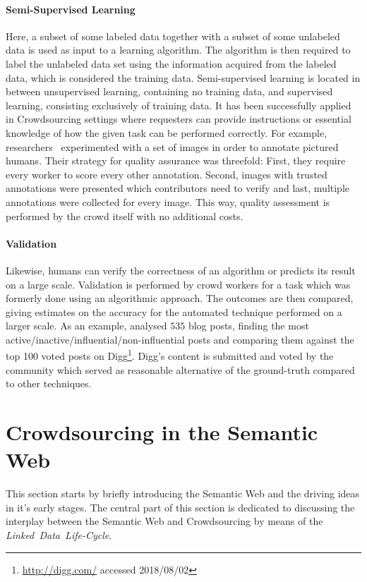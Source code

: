 \documentclass[draft,final]{vutinfth} %
\begin{document}
\paragraph{Semi-Supervised Learning} Here, a subset of some labeled data together with a subset of some unlabeled data is used as input to a learning
algorithm. The algorithm is then required to label the unlabeled data set using the information acquired from the labeled data, which is considered the training data. Semi-supervised learning is located in between unsupervised learning, containing no training data, and supervised learning, consisting exclusively of training data. It has been successfully applied in Crowdsourcing settings where requesters can provide instructions or essential knowledge of how the given task
can be performed correctly. For example, researchers~\cite{sorokin2008} experimented with a set of images in order to annotate pictured humans. Their strategy for quality assurance was threefold: First, they require every worker to score every other annotation. Second, images with trusted annotations were presented which contributors need to verify and last, multiple annotations were collected for every image. This way, quality assessment is performed by the crowd itself with no additional costs.  

\paragraph{Validation} Likewise, humans can verify the correctness of an algorithm or predicts its result on a large scale. Validation is performed by crowd workers for a task which was formerly done using an algorithmic approach. The outcomes are then compared, giving estimates on the accuracy for the automated technique performed on a larger scale. As an example, \cite{agarwal2008} analysed $535$ blog posts, finding the most active/inactive/influential/non-influential posts and comparing them against the top 100 voted posts on Digg\footnote{\url{http://digg.com/} accessed 2018/08/02}. Digg's content is submitted and voted by the community which served as reasonable alternative of the ground-truth compared to other techniques.  

\section{Crowdsourcing in the Semantic Web}
This section starts by briefly introducing the Semantic Web and the driving ideas in it's early stages. The central part of this section is dedicated to discussing the interplay between the Semantic Web and Crowdsourcing by means of the \textit{Linked~Data~Life-Cycle}. 
\end{document}
